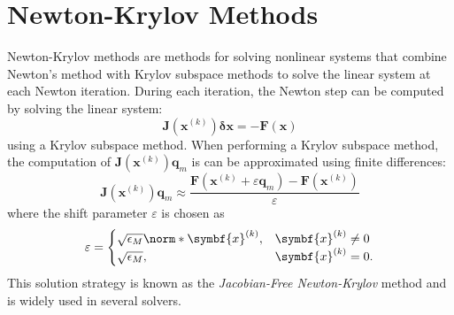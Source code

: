 \documentclass{article}
\begin{document}
\section{Newton-Krylov Methods}
Newton-Krylov methods are methods for solving nonlinear systems that
combine Newton's method with Krylov subspace methods to solve the
linear system at each Newton iteration. During each iteration, the
Newton step can be computed by solving the linear system:
\begin{equation*}
    \symbf{J}\left( \symbf{x}^{\left( k \right)} \right) \symbf{\delta} \symbf{x} = -\symbf{F}\left( \symbf{x} \right)
\end{equation*}
using a Krylov subspace method. When performing a Krylov subspace method,
the computation of \(\symbf{J}\left( \symbf{x}^{\left( k \right)} \right) \symbf{q}_m\)
is can be approximated using finite differences:
\begin{equation*}
    \symbf{J}\left( \symbf{x}^{\left( k \right)} \right) \symbf{q}_m \approx \frac{\symbf{F}\left( \symbf{x}^{\left( k \right)} + \varepsilon \symbf{q}_m \right) - \symbf{F}\left( \symbf{x}^{\left( k \right)} \right)}{\varepsilon}
\end{equation*}
where the shift parameter \(\varepsilon\) is chosen as
\begin{equation*}
    \varepsilon = \begin{cases}
        \sqrt{\epsilon_M} \norm*{\symbf{x}^{\left( k \right)}}, & \symbf{x}^{\left( k \right)} \neq 0 \\
        \sqrt{\epsilon_M}, & \symbf{x}^{\left( k \right)} = 0.
    \end{cases}
\end{equation*}
This solution strategy is known as the \textit{Jacobian-Free Newton-Krylov}
method and is widely used in several solvers.
\pagebreak
\end{document}
